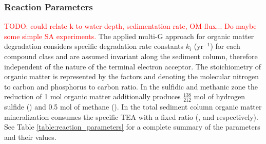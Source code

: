 \documentclass[gmd, manuscript]{copernicus}
\begin{document}
\subsubsection {Reaction Parameters}
\textcolor{red}{TODO: could relate k to water-depth, sedimentation rate, OM-flux... Do maybe some simple SA experiments.} 
The applied multi-G approach for organic matter degradation considers specific degradation rate constants $k_i$ (yr$^{-1}$) for each compound class 
and are assumed invariant along the sediment column, therefore independent of the nature of the terminal electron acceptor. 
The stoichiometry of organic matter is represented by the factors  and  denoting the molecular nitrogen to carbon and phosphorus to carbon ratio. 
In the sulfidic and methanic zone the 
reduction of 1 mol organic matter additionally produces $\frac{138}{212}$ mol of hydrogen sulfide () and 0.5 mol of methane (). 
In the total sediment column organic matter mineralization consumes the specific TEA with a fixed ratio (,  and  respectively). 
See Table \ref{table:reaction_parameters} for a complete summary of the parameters and their values.
\end{document}
